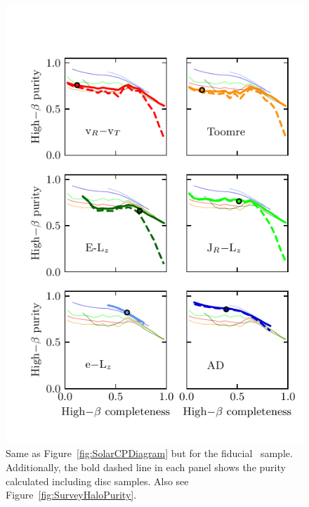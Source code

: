 \begin{figure}
    \centering
    \includegraphics[width=\halftextwidth]{figure/ch2/SurveyHaloCompletenessPurity.pdf}
    \caption{Same as Figure~\ref{fig:SolarCPDiagram} but for the fiducial \survey\ sample. Additionally, the bold dashed line in each panel shows the purity calculated including disc samples. Also see Figure~\ref{fig:SurveyHaloPurity}.}
    \label{fig:SurveyCPDiagram}
\end{figure}

